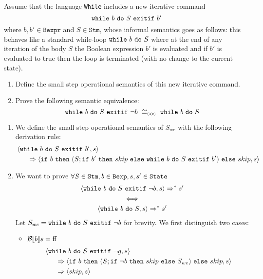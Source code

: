 \begin{exercise}{
    Assume that the language \texttt{While} includes a new iterative command
    \[ \texttt{while}\ b\ \texttt{do}\ S\ \texttt{exitif}\ b' \]
    where $b, b' \in \texttt{Bexpr}$ and $S \in \texttt{Stm}$, whose informal semantics goes as follows: this behaves like a standard while-loop $\texttt{while}\ b\ \texttt{do}\ S$ where at the end of any iteration of the body $S$ the Boolean expression $b'$ is evaluated and if $b'$ is evaluated to true then the loop is terminated (with no change to the current state).
    \begin{enumerate}
        \item Define the small step operational semantics of this new iterative command.
        \item Prove the following semantic equivalence:
        \[ \wwexitif{b}{S}{\neg b}\ \SOScong\ \wwhile{b}{S} \]
    \end{enumerate}
}
    \begin{enumerate}
        \item We define the small step operational semantics of $S_{we}$ with the following derivation rule:
            \begin{align*}
                &\left<\texttt{while}\ b\ \texttt{do}\ S\ \texttt{exitif}\ b', s\right>
                \\&\quad\ \ \Rightarrow \left<\texttt{if}\ b\ \texttt{then}\ (S; \texttt{if}\ b'\ \texttt{then}\ skip\ \texttt{else}\ \texttt{while}\ b\ \texttt{do}\ S\ \texttt{exitif}\ b')\ \texttt{else}\ skip, s\right>
            \end{align*}
        \item We want to prove $\forall S \in \texttt{Stm}, b \in \texttt{Bexp}, s, s' \in \texttt{State}$
            \begin{gather*}
                \left<\texttt{while}\ b\ \texttt{do}\ S\ \texttt{exitif}\ \neg b, s\right> \Rightarrow^* s' \\
                \iff \\
                \left<\texttt{while}\ b\ \texttt{do}\ S, s\right> \Rightarrow^* s'
            \end{gather*}
            Let $S_{we} = \texttt{while}\ b\ \texttt{do}\ S\ \texttt{exitif}\ \neg b$ for brevity.
            We first distinguish two cases:
            \begin{itemize}
                \item $\mathcal{B} \llbracket b \rrbracket s = \text{ff}$
                    \begin{align*}
                        &\instr{\wwexitif{b}{S}{\neg g}}{s}
                        \\&\quad\ \ \Rightarrow \instr{\wif{b}{(S; \wif{\neg b}{skip}{S_{we}})}{skip}}{s}
                        \\&\quad\ \ \Rightarrow \instr{skip}{s}

\end{align*}
\end{itemize}
\end{enumerate}
\end{exercise}
